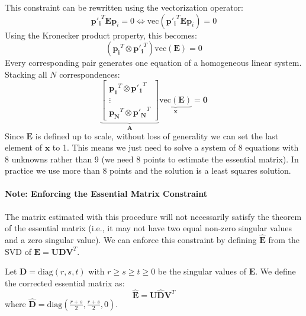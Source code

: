 \documentclass[11pt,a4paper]{article}
\theoremstyle{definition}
\theoremstyle{plain}
\theoremstyle{remark}
\begin{document}
This constraint can be rewritten using the vectorization operator:
\begin{equation} \nonumber
    \mathbf{{p}'_i}^T \mathbf{E} \mathbf{p}_i = 0 \Leftrightarrow \text{vec}(\mathbf{{p}'_i}^T \mathbf{E} \mathbf{p}_i) = 0
\end{equation}
Using the Kronecker product property, this becomes:
\begin{equation} \nonumber
    (\mathbf{{p}_i}^T \otimes \mathbf{{p}'_i}^T) \text{vec}(\mathbf{E}) = 0
\end{equation}
Every corresponding pair generates one equation of a homogeneous linear system. Stacking all $N$ correspondences:
\begin{equation} \label{eq:essential_linear_system}
    \underbrace{
    \begin{bmatrix}
    \mathbf{{p}_1}^T \otimes \mathbf{{p}'_1}^T \\
    \vdots \\
    \mathbf{{p}_N}^T \otimes \mathbf{{p}'_N}^T
    \end{bmatrix}
    }_{\mathbf{A}}
    \underbrace{\text{vec}(\mathbf{E})}_{\mathbf{x}} = \mathbf{0}
\end{equation}
Since $\mathbf{E}$ is defined up to scale, without loss of generality we can set the last element of $\mathbf{x}$ to 1.
This means we just need to solve a system of 8 equations with 8 unknowns rather than 9 
(we need 8 points to estimate the essential matrix). In practice we use more than 8 points
and the solution is a least squares solution.

\paragraph{Note: Enforcing the Essential Matrix Constraint}
The matrix estimated with this procedure will not necessarily satisfy the theorem of the essential matrix (i.e., it may not have two equal non-zero singular values and a zero singular value).
We can enforce this constraint by defining $\hat{\mathbf{E}}$ from the SVD of $\mathbf{E} = \mathbf{U} \mathbf{D} \mathbf{V}^T$.

Let $\mathbf{D} = \text{diag}(r, s, t)$ with $r \geq s \geq t \geq 0$ be the singular values of $\mathbf{E}$.
We define the corrected essential matrix as:
\begin{equation} \label{eq:corrected_E}
    \hat{\mathbf{E}} = \mathbf{U} \hat{\mathbf{D}} \mathbf{V}^T
\end{equation}
where $\hat{\mathbf{D}} = \text{diag}\left(\frac{r+s}{2}, \frac{r+s}{2}, 0\right)$.
\end{document}
